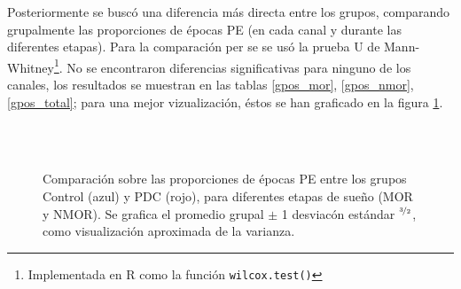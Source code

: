 \documentclass[12pt,a4paper]{mitthesis}
\begin{document}
Posteriormente se busc\'o una diferencia m\'as directa entre los grupos, comparando grupalmente
las proporciones de \'epocas PE (en cada canal y durante las diferentes etapas). Para la 
comparaci\'on per se se us\'o la prueba U de Mann-Whitney\footnote{Implementada en R como la 
funci\'on \texttt{wilcox.test()}}.
No se encontraron diferencias significativas para ninguno de los canales, los resultados se 
muestran en las tablas \ref{gpos_mor}, \ref{gpos_nmor}, \ref{gpos_total}; para una mejor 
vizualizaci\'on, \'estos se han graficado en la figura \ref{comparacion_graf}.

\begin{figure}
\centering
{}\\
\\
\caption{Comparaci\'on sobre las proporciones de \'epocas PE entre los grupos Control (azul) y
PDC (rojo), para diferentes etapas de sue\~no (MOR y NMOR). Se grafica el promedio grupal $\pm$
1 desviac\'on est\'andar $^{\nicefrac{3}{2}}$, como visualizaci\'on aproximada de la varianza.}
\label{comparacion_graf}
\end{figure}
\end{document}
